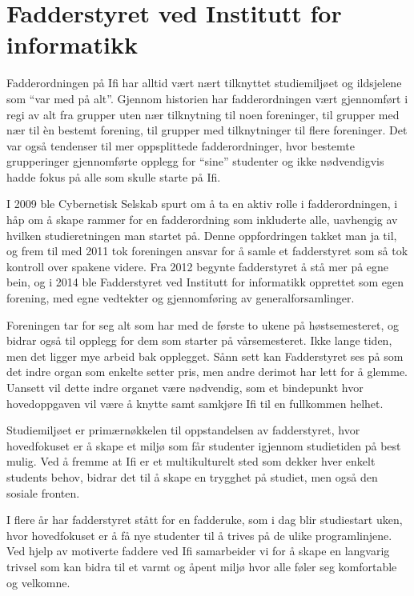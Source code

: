 \chapter{Fadderstyret ved Institutt for informatikk}

\author{Skrevet av Thao Tran, leder for Fadderstyret ved Institutt for informatikk, og Arne Hassel}

Fadderordningen på Ifi har alltid vært nært tilknyttet studiemiljøet og ildsjelene som ``var med på alt''. Gjennom historien har fadderordningen vært gjennomført i regi av alt fra grupper uten nær tilknytning til noen foreninger, til grupper med nær til èn bestemt forening, til grupper med tilknytninger til flere foreninger. Det var også tendenser til mer oppsplittede fadderordninger, hvor bestemte grupperinger gjennomførte opplegg for ``sine'' studenter og ikke nødvendigvis hadde fokus på alle som skulle starte på Ifi.

I 2009 ble Cybernetisk Selskab spurt om å ta en aktiv rolle i fadderordningen, i håp om å skape rammer for en fadderordning som inkluderte alle, uavhengig av hvilken studieretningen man startet på. Denne oppfordringen takket man ja til, og frem til med 2011 tok foreningen ansvar for å samle et fadderstyret som så tok kontroll over spakene videre. Fra 2012 begynte fadderstyret å stå mer på egne bein, og i 2014 ble Fadderstyret ved Institutt for informatikk opprettet som egen forening, med egne vedtekter og gjennomføring av generalforsamlinger.

Foreningen tar for seg alt som har med de første to ukene på høstsemesteret, og bidrar også til opplegg for dem som starter på vårsemesteret. Ikke lange tiden, men det ligger mye arbeid bak opplegget. Sånn sett kan Fadderstyret ses på som det indre organ som enkelte setter pris, men andre derimot har lett for å glemme. Uansett vil dette indre organet være nødvendig, som et bindepunkt hvor hovedoppgaven vil være å knytte samt samkjøre Ifi til en fullkommen helhet.

Studiemiljøet er primærnøkkelen til oppstandelsen av fadderstyret, hvor hovedfokuset er å skape et miljø som får studenter igjennom studietiden på best mulig. Ved å fremme at Ifi er et multikulturelt sted som dekker hver enkelt students behov, bidrar det til å skape en trygghet på studiet, men også den sosiale fronten.

I flere år har fadderstyret stått for en fadderuke, som i dag blir studiestart uken, hvor hovedfokuset er å få nye studenter til å trives på de ulike programlinjene. Ved hjelp av motiverte faddere ved Ifi samarbeider vi for å skape en langvarig trivsel som kan bidra til et varmt og åpent miljø hvor alle føler seg komfortable og velkomne.
